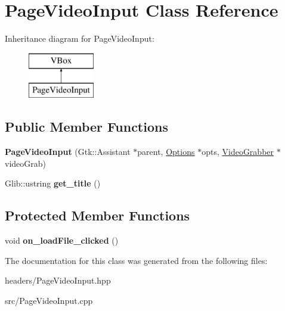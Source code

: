 \hypertarget{classPageVideoInput}{\section{Page\-Video\-Input Class Reference}
\label{classPageVideoInput}
}
Inheritance diagram for Page\-Video\-Input\-:\begin{figure}[H]
\begin{center}
\leavevmode
\includegraphics[height=2.000000cm]{classPageVideoInput}
\end{center}
\end{figure}
\subsection*{Public Member Functions}
\begin{DoxyCompactItemize}
\item 
\hypertarget{classPageVideoInput_a2f04dc94991b0eef4bce981593c2b63a}{{\bfseries Page\-Video\-Input} (Gtk\-::\-Assistant $\ast$parent, \hyperlink{structOptions}{Options} $\ast$opts, \hyperlink{classVideoGrabber}{Video\-Grabber} $\ast$video\-Grab)}\label{classPageVideoInput_a2f04dc94991b0eef4bce981593c2b63a}

\item 
\hypertarget{classPageVideoInput_aa882055b9fec8bdf207755ffba032f2d}{Glib\-::ustring {\bfseries get\-\_\-title} ()}\label{classPageVideoInput_aa882055b9fec8bdf207755ffba032f2d}

\end{DoxyCompactItemize}
\subsection*{Protected Member Functions}
\begin{DoxyCompactItemize}
\item 
\hypertarget{classPageVideoInput_a2687b087ef936f3b286092a2d3dc8abb}{void {\bfseries on\-\_\-load\-File\-\_\-clicked} ()}\label{classPageVideoInput_a2687b087ef936f3b286092a2d3dc8abb}

\end{DoxyCompactItemize}


The documentation for this class was generated from the following files\-:\begin{DoxyCompactItemize}
\item 
headers/Page\-Video\-Input.\-hpp\item 
src/Page\-Video\-Input.\-cpp\end{DoxyCompactItemize}
